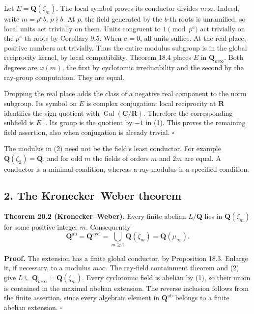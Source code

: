 \documentclass[11pt,a4paper]{article}
\begin{document}
Let \(E=\mathbf Q(\zeta_m)\). The local symbol proves its conductor
divides \(m\infty\). Indeed, write \(m=p^a b\), \(p\nmid b\). At \(p\),
the field generated by the \(b\)-th roots is unramified, so local units
act trivially on them. Units congruent to \(1\pmod{p^a}\) act trivially
on the \(p^a\)-th roots by Corollary 9.5. When \(a=0\), all units
suffice. At the real place, positive numbers act trivially. Thus the
entire modulus subgroup is in the global reciprocity kernel, by local
compatibility. Theorem 18.4 places \(E\) in \(\mathbf Q_{m\infty}\).
Both degrees are \(\varphi(m)\), the first by cyclotomic irreducibility
and the second by the ray-group computation. They are equal.

Dropping the real place adds the class of a negative real component to
the norm subgroup. Its symbol on \(E\) is complex conjugation: local
reciprocity at \(\mathbf R\) identifies the sign quotient with
\(\operatorname{Gal}(\mathbf C/\mathbf R)\). Therefore the corresponding
subfield is \(E^+\). Its group is the quotient by \(-1\) in (1). This
proves the remaining field assertion, also when conjugation is already
trivial. \(\square\)

The modulus in (2) need not be the field's least conductor. For example
\(\mathbf Q(\zeta_2)=\mathbf Q\), and for odd \(m\) the fields of orders
\(m\) and \(2m\) are equal. A conductor is a minimal condition, whereas
a ray modulus is a specified condition.

\subsection{2. The Kronecker--Weber
theorem}\label{the-kroneckerweber-theorem}

\textbf{Theorem 20.2 (Kronecker--Weber).} Every finite abelian
\(L/\mathbf Q\) lies in \(\mathbf Q(\zeta_m)\) for some positive integer
\(m\). Consequently \[
\mathbf Q^{\mathrm{ab}}=\mathbf Q^{\mathrm{cycl}}
=\bigcup_{m\geq1}\mathbf Q(\zeta_m)=\mathbf Q(\mu_\infty).
\tag{3}
\]

\textbf{Proof.} The extension has a finite global conductor, by
Proposition 18.3. Enlarge it, if necessary, to a modulus \(m\infty\).
The ray-field containment theorem and (2) give
\(L\subseteq\mathbf Q_{m\infty}=\mathbf Q(\zeta_m)\). Every cyclotomic
field is abelian by (1), so their union is contained in the maximal
abelian extension. The reverse inclusion follows from the finite
assertion, since every algebraic element in \(\mathbf Q^{\mathrm{ab}}\)
belongs to a finite abelian extension. \(\square\)
\end{document}
